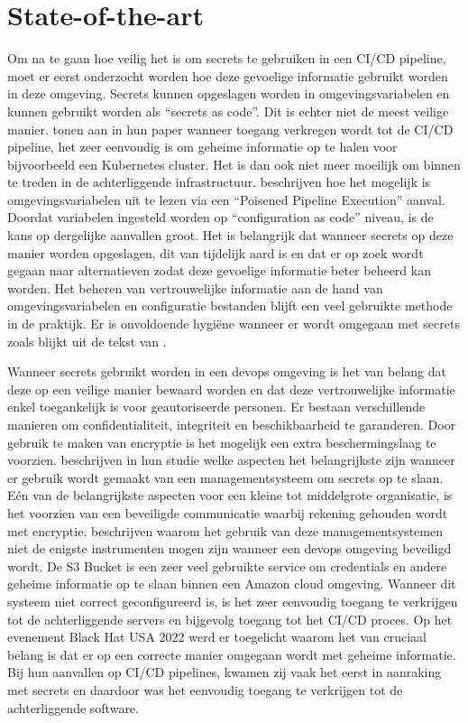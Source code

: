\section{State-of-the-art}%
\label{sec:state-of-the-art}

Om na te gaan hoe veilig het is om secrets te gebruiken in een CI/CD pipeline, moet er eerst onderzocht worden hoe deze gevoelige informatie gebruikt worden in deze omgeving. Secrets kunnen opgeslagen worden in omgevingsvariabelen en kunnen gebruikt worden als “secrets as code”. Dit is echter niet de meest veilige manier. \textcite{Pecka2022} tonen aan in hun paper wanneer toegang verkregen wordt tot de CI/CD pipeline, het zeer eenvoudig is om geheime informatie op te halen voor bijvoorbeeld een Kubernetes cluster. Het is dan ook niet meer moeilijk om binnen te treden in de achterliggende infrastructuur. \textcite{Gil} beschrijven hoe het mogelijk is omgevingsvariabelen uit te lezen via een “Poisened Pipeline Execution” aanval. Doordat variabelen ingesteld worden op “configuration as code” niveau, is de kans op dergelijke aanvallen groot. Het is belangrijk dat wanneer secrets op deze manier worden opgeslagen, dit van tijdelijk aard is en dat er op zoek wordt gegaan naar alternatieven zodat deze gevoelige informatie beter beheerd kan worden. Het beheren van vertrouwelijke informatie aan de hand van omgevingsvariabelen en configuratie bestanden blijft een veel gebruikte methode in de praktijk. Er is onvoldoende hygiëne wanneer er wordt omgegaan met secrets zoals blijkt uit de tekst van \autocite{Gil}. 

Wanneer secrets gebruikt worden in een devops omgeving is het van belang dat deze op een veilige manier bewaard worden en dat deze vertrouwelijke informatie enkel toegankelijk is voor geautoriseerde personen. Er bestaan verschillende manieren om confidentialiteit, integriteit en beschikbaarheid te garanderen. Door gebruik te maken van encryptie is het mogelijk een extra beschermingslaag te voorzien. \textcite{Kuzminykh2020} beschrijven in hun studie welke aspecten het belangrijkste zijn wanneer er gebruik wordt gemaakt van een managementsysteem om secrets op te slaan.  Eén van de belangrijkste aspecten voor een kleine tot middelgrote organisatie, is het voorzien van een beveiligde communicatie waarbij rekening gehouden wordt met encryptie. \autocite{AaronHaymore} beschrijven waarom het gebruik van deze managementsystemen niet de enigste instrumenten mogen zijn wanneer een devops omgeving beveiligd wordt. De S3 Bucket is een zeer veel gebruikte service om credentials en andere geheime informatie op te slaan binnen een Amazon cloud omgeving. Wanneer dit systeem niet correct geconfigureerd is, is het zeer eenvoudig toegang te verkrijgen tot de achterliggende servers en bijgevolg toegang tot het CI/CD proces. Op het evenement Black Hat USA 2022 \autocite{Gazdag} werd er toegelicht waarom het van cruciaal belang is dat er op een correcte manier omgegaan wordt met geheime informatie. Bij hun aanvallen op CI/CD pipelines, kwamen zij vaak het eerst in aanraking met secrets en daardoor was het eenvoudig toegang te verkrijgen tot de achterliggende software. 

